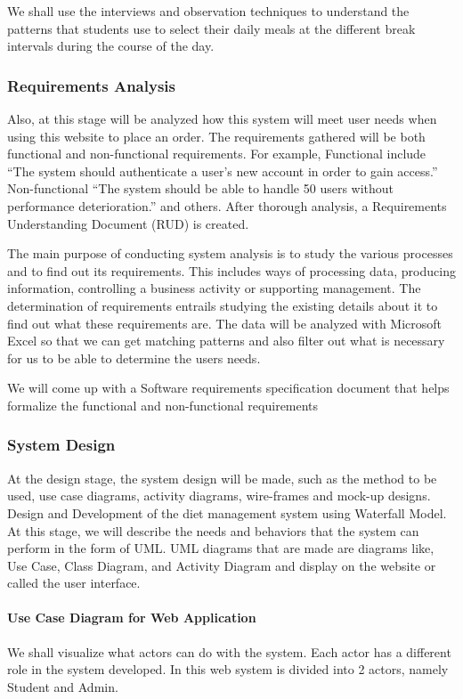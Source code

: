 \documentclass{article}
\begin{document}
We shall use the interviews and observation techniques to understand the patterns that students use to select their daily meals at the different break intervals during the course of the day.

\subsubsection{Requirements Analysis}
Also, at this stage will be analyzed how this system will meet user needs when using this website to place an order. The requirements gathered will be both functional and non-functional requirements. For example, Functional include “The system should authenticate a user’s new account in order to gain access.” Non-functional “The system should be able to handle 50 users without performance deterioration.” and others. After thorough analysis, a Requirements Understanding Document (RUD) is created.

The main purpose of conducting system analysis is to study the various processes and to find out its requirements. This includes ways of processing data, producing information, controlling a business activity or supporting management. The determination of requirements entrails studying the existing details about it to find out what these requirements are. The data will be analyzed with Microsoft Excel so that we can get matching patterns and also filter out what is necessary for us to be able to determine the users needs.

We will come up with a Software requirements specification document that helps formalize the functional and non-functional requirements

\subsubsection{System Design}
At the design stage, the system design will be made, such as the method to be used, use case diagrams, activity diagrams, wire-frames and mock-up designs. Design and Development of the diet management system using Waterfall Model. At this stage, we will describe the needs and behaviors that the system can perform in the form of UML. UML diagrams that are made are diagrams like, Use Case, Class Diagram, and Activity Diagram and display on the website or called the user interface.

\paragraph{Use Case Diagram for Web Application\\}
We shall visualize what actors can do with the system. Each actor has a different role in the system developed. In this web system is divided into 2 actors, namely Student and Admin.
\end{document}
